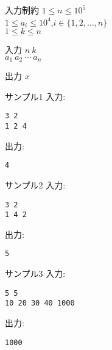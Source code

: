 \documentclass[a4paper,twoside,onecolumn,openany,article,10pt]{memoir}
\theoremstyle{remark}
\begin{document}
\begin{itembox}[l]{入力制約}
$1\le n\le 10^5$\\
$1\le a_i\le 10^4$,\hspace{2em}$i\in\{1,2,\dotsc,n\}$\\
$1\le k\le n$
\end{itembox}

\begin{itembox}[l]{入力}
$n~k$\\
$a_1~a_2~\dotsb~a_n$
\end{itembox}

\begin{itembox}[l]{出力}
$x$
\end{itembox}

\begin{itembox}[l]{サンプル1}
入力:
\begin{verbatim}
3 2
1 2 4
\end{verbatim}
出力:
\begin{verbatim}
4
\end{verbatim}
\end{itembox}

\begin{itembox}[l]{サンプル2}
入力:
\begin{verbatim}
3 2
1 4 2
\end{verbatim}
出力:
\begin{verbatim}
5
\end{verbatim}
\end{itembox}

\begin{itembox}[l]{サンプル3}
入力:
\begin{verbatim}
5 5
10 20 30 40 1000
\end{verbatim}
出力:
\begin{verbatim}
1000
\end{verbatim}
\end{itembox}
\end{document}
